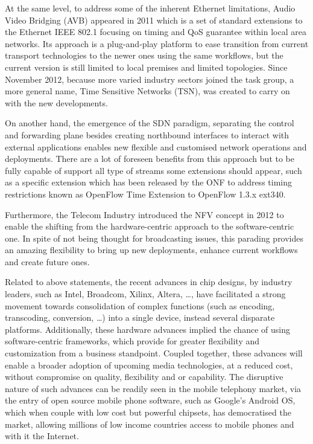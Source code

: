 At the same level, to address some of the inherent Ethernet limitations, Audio Video Bridging (AVB) appeared in 2011 which is a set of standard extensions to the Ethernet IEEE 802.1 focusing on timing and QoS guarantee within local area networks. Its approach is a plug-and-play platform to ease transition from current transport technologies to the newer ones using the same workflows, but the current version is still limited to local premises and limited topologies. Since November 2012, because more varied industry sectors joined the task group, a more general name, Time Sensitive Networks (TSN), was created to carry on with the new developments.

On another hand, the emergence of the SDN paradigm, separating the control and forwarding plane
besides creating northbound interfaces to interact with external applications enables new flexible and customised network operations and deployments. There are a lot of foreseen benefits from this
approach but to be fully capable of support all type of streams some extensions should appear,
such as a specific extension which has been released by the ONF to address timing restrictions known
as OpenFlow Time Extension to OpenFlow 1.3.x ext340.

Furthermore, the Telecom Industry introduced the NFV concept in 2012 to enable the shifting from
the hardware-centric approach to the software-centric one. In spite of not being thought for
broadcasting issues, this parading provides an amazing flexibility to bring up new deployments,
enhance current workflows and create future ones.

Related to above statements, the recent advances in chip designs, by industry leaders, such as Intel, Broadcom, Xilinx, Altera, \ldots, have facilitated a strong movement towards consolidation of complex functions (such as encoding, transcoding, conversion, \ldots ) into a single device, instead
several disparate platforms. Additionally, these hardware advances implied the chance of using
software-centric frameworks, which provide for greater flexibility and customization from a business
standpoint. Coupled together, these advances will enable a broader adoption of upcoming media
technologies, at a reduced cost, without compromise on quality, flexibility and or capability. The
disruptive nature of such advances can be readily seen in the mobile telephony market, via the entry
of open source mobile phone software, such as Google’s Android OS, which when couple with low
cost but powerful chipsets, has democratised the market, allowing millions of low income countries
access to mobile phones and with it the Internet.

